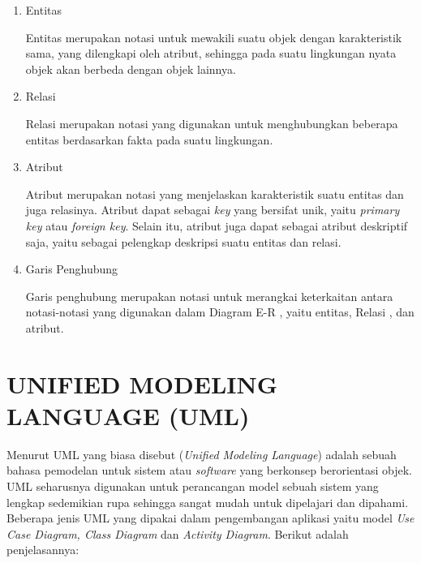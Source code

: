\begin{enumerate}
	\item Entitas
	\par Entitas merupakan notasi untuk mewakili suatu objek dengan karakteristik sama, yang dilengkapi oleh atribut, sehingga pada suatu lingkungan nyata objek akan berbeda dengan objek lainnya.
	\pagebreak
	\item Relasi
	\par Relasi merupakan notasi yang digunakan untuk menghubungkan beberapa entitas berdasarkan fakta pada suatu lingkungan.
	\item Atribut
	\par Atribut merupakan notasi yang menjelaskan karakteristik suatu entitas dan juga relasinya. Atribut dapat sebagai \textit{key} yang bersifat unik, yaitu \textit{primary key} atau \textit{foreign key}. Selain itu, atribut juga dapat sebagai atribut deskriptif saja, yaitu sebagai pelengkap deskripsi suatu entitas dan relasi.	
	\item Garis Penghubung
	\par Garis penghubung merupakan notasi untuk merangkai keterkaitan antara notasi-notasi yang digunakan dalam Diagram E-R , yaitu entitas, Relasi , dan atribut.
\end{enumerate}

\section{\uppercase{Unified Modeling language (UML)}}
Menurut \citep{nugraha2016perancangan} UML yang biasa disebut (\textit{Unified Modeling Language}) adalah sebuah bahasa pemodelan untuk sistem atau \textit{software} yang berkonsep berorientasi objek. UML seharusnya digunakan untuk perancangan model sebuah sistem yang lengkap sedemikian rupa sehingga sangat mudah untuk dipelajari dan dipahami. Beberapa jenis UML yang dipakai dalam pengembangan aplikasi yaitu model \textit{Use Case Diagram, Class Diagram} dan \textit{Activity Diagram}. Berikut adalah penjelasannya:

